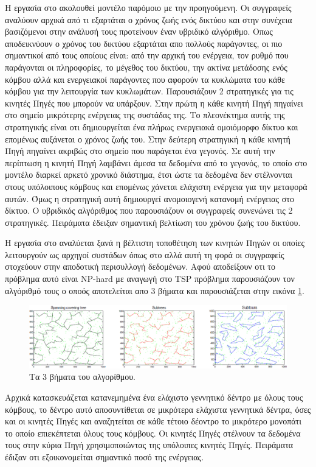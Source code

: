 Η εργασία στο \cite{event_residual_hybrid} ακολουθεί μοντέλο παρόμοιο με την προηγούμενη. Οι συγγραφείς αναλύουν αρχικά από τι εξαρτάται ο χρόνος
ζωής ενός δικτύου και στην συνέχεια βασιζόμενοι στην ανάλυσή τους προτείνουν έναν υβριδικό αλγόριθμο. Οπως αποδεικνύουν ο χρόνος του δικτύου εξαρτάται απο πολλούς
παράγοντες, οι πιο σημαντικοί από τους οποίους είναι: από την αρχική του ενέργεια, τον ρυθμό που παράγονται οι πληροφορίες, το μέγεθος του δικτύου, την ακτίνα
μετάδοσης ενός κόμβου αλλά και ενεργειακοί παράγοντες που αφορούν τα κυκλώματα του κάθε κόμβου για την λειτουργία των κυκλωμάτων. Παρουσιάζουν 2 στρατηγικές για τις
κινητές Πηγές που μπορούν να υπάρξουν. Στην πρώτη η κάθε κινητή Πηγή πηγαίνει στο σημείο μικρότερης ενέργειας της συστάδας της. Το πλεονέκτημα αυτής της στρατηγικής
είναι οτι δημιουργείται ένα πλήρως ενεργειακά ομοιόμορφο δίκτυο και επομένως αυξάνεται ο χρόνος ζωής του. Στην δεύτερη στρατηγική η κάθε κινητή Πηγή πηγαίνει ακριβώς
στο σημείο που παράγεται ένα γεγονός. Σε αυτή την περίπτωση η κινητή Πηγή λαμβάνει άμεσα τα δεδομένα από το γεγονός, το οποίο στο μοντέλο διαρκεί αρκετό χρονικό
διάστημα, έτσι ώστε τα δεδομένα δεν στέλνονται στους υπόλοιπους κόμβους και επομένως χάνεται ελάχιστη ενέργεια για την μεταφορά αυτών. Όμως η στρατηγική αυτή
δημιουργεί ανομοιογενή κατανομή ενέργειας στο δίκτυο. Ο υβριδικός αλγόριθμος που παρουσιάζουν οι συγγραφείς συνενώνει τις 2 στρατηγικές. Πειράματα έδειξαν
σημαντική βελτίωση του χρόνου ζωής του δικτύου.

Η εργασία στο \cite{yuanyuan2} αναλύεται ξανά η βέλτιστη τοποθέτηση των κινητών Πηγών οι οποίες λειτουργούν ως αρχηγοί συστάδων όπως στο \cite{yuanyuan1} αλλά αυτή
τη φορά οι συγγραφείς στοχεύουν στην αποδοτική περισυλλογή δεδομένων. Αφού αποδείξουν οτι το πρόβλημα αυτό είναι NP-hard με αναγωγή στο TSP πρόβλημα παρουσιάζουν τον
αλγόριθμό τους ο οποός αποτελείται απο 3 βήματα και παρουσιάζεται στην εικόνα \ref{fig:yuanyuan_mst}.
\begin{figure}[h]
	\centering
	\includegraphics[width=\textwidth]{images/yuanyuan_mst.eps}
	\caption{Τα 3 βήματα του αλγορίθμου.}
	\label{fig:yuanyuan_mst}
\end{figure}
Αρχικά κατασκευάζεται κατανεμημένα ένα ελάχιστο γεννητικό δέντρο με όλους τους κόμβους, το δέντρο αυτό αποσυντίθεται σε μικρότερα ελάχιστα γεννητικά δέντρα, όσες και
οι κινητές Πηγές και αναζητείται σε κάθε τέτοιο δέοντρο το μικρότερο μονοπάτι το οποίο επιεκέπτεται όλους τους κόμβους. Οι κινητές Πηγές στέλνουν τα δεδομένα τους
στην κύρια Πηγή χρησιμοποιώντας της υπόλοιπες κινητές Πηγές. Πειράματα έδιξαν οτι εξοικονομείται σημαντικό ποσό της ενέργειας.


